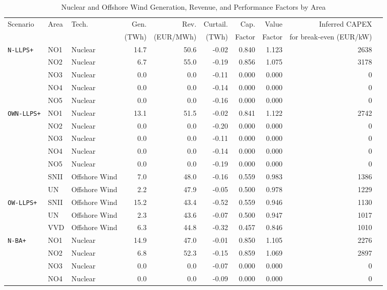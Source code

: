 \begin{table}[htbp]
\centering
\caption{Nuclear and Offshore Wind Generation, Revenue, and Performance Factors by Area}
\label{tab:nuclear_offshore_revenue}
\begin{tabular}{lllrrrrrrr}
\toprule
Scenario & Area & Tech. & Gen. & Rev. & Curtail. & Cap. & Value & Inferred CAPEX \\
         &      &       & (TWh) & (EUR/MWh) & (TWh) & Factor & Factor & for break-even (EUR/kW) \\
\midrule
\multirow{5}{*}{\texttt{N-LLPS+}} & NO1 & Nuclear & 14.7 & 50.6 & -0.02 & 0.840 & 1.123 & 2638 \\
 & NO2 & Nuclear & 6.7 & 55.0 & -0.19 & 0.856 & 1.075 & 3178 \\
 & NO3 & Nuclear & 0.0 & 0.0 & -0.11 & 0.000 & 0.000 & 0 \\
 & NO4 & Nuclear & 0.0 & 0.0 & -0.14 & 0.000 & 0.000 & 0 \\
 & NO5 & Nuclear & 0.0 & 0.0 & -0.16 & 0.000 & 0.000 & 0 \\
\midrule
\multirow{7}{*}{\texttt{OWN-LLPS+}} & NO1 & Nuclear & 13.1 & 51.5 & -0.02 & 0.841 & 1.122 & 2742 \\
 & NO2 & Nuclear & 0.0 & 0.0 & -0.20 & 0.000 & 0.000 & 0 \\
 & NO3 & Nuclear & 0.0 & 0.0 & -0.11 & 0.000 & 0.000 & 0 \\
 & NO4 & Nuclear & 0.0 & 0.0 & -0.14 & 0.000 & 0.000 & 0 \\
 & NO5 & Nuclear & 0.0 & 0.0 & -0.19 & 0.000 & 0.000 & 0 \\
 & SNII & Offshore Wind & 7.0 & 48.0 & -0.16 & 0.559 & 0.983 & 1386 \\
 & UN & Offshore Wind & 2.2 & 47.9 & -0.05 & 0.500 & 0.978 & 1229 \\
\midrule
\multirow{3}{*}{\texttt{OW-LLPS+}} & SNII & Offshore Wind & 15.2 & 43.4 & -0.52 & 0.559 & 0.946 & 1130 \\
 & UN & Offshore Wind & 2.3 & 43.6 & -0.07 & 0.500 & 0.947 & 1017 \\
 & VVD & Offshore Wind & 6.3 & 44.8 & -0.32 & 0.457 & 0.846 & 1010 \\
\midrule
\multirow{5}{*}{\texttt{N-BA+}} & NO1 & Nuclear & 14.9 & 47.0 & -0.01 & 0.850 & 1.105 & 2276 \\
 & NO2 & Nuclear & 6.8 & 52.3 & -0.15 & 0.859 & 1.069 & 2897 \\
 & NO3 & Nuclear & 0.0 & 0.0 & -0.07 & 0.000 & 0.000 & 0 \\
 & NO4 & Nuclear & 0.0 & 0.0 & -0.09 & 0.000 & 0.000 & 0 \\

\end{tabular}
\end{table}
